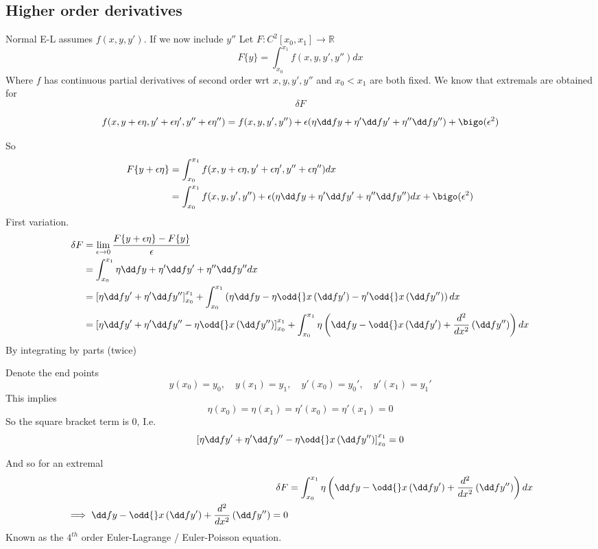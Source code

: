 \documentclass{E:/Documents/Latex/myassignment}
\begin{document}
\subsection{Higher order derivatives}
Normal E-L assumes $f(x,y,y')$. If we now include $y''$
Let $F : C^2[x_0,x_1] \to \mathbb{R}$
\[F\{y\} = \int_{x_0}^{x_1} f(x,y,y',y'')dx\]
Where $f$ has continuous partial derivatives of second order wrt $x,y,y',y''$ and $x_0<x_1$ are both fixed.
We know that extremals are obtained for
\[\delta F \]

\begin{align*}
	f(x,y+\epsilon \eta, y' + \epsilon \eta', y'' + \epsilon \eta '' ) &= f(x,y,y',y'') + \epsilon(\eta \dd fy + \eta' \dd f{y'} + \eta'' \dd f{y''}) + \bigo( \epsilon^2)\\
\end{align*}

So
\begin{align*}
	F\{y + \epsilon \eta\} &= \int_{x_0}^{x_1} f(x,y+\epsilon \eta, y' + \epsilon \eta', y'' + \epsilon \eta '' ) dx\\
	&=\int_{x_0}^{x_1}  f(x,y,y',y'') + \epsilon(\eta \dd fy + \eta' \dd f{y'} + \eta'' \dd f{y''})dx + \bigo( \epsilon^2)
\end{align*}
First variation.
\begin{align*}
	\delta F &= \lim_{\epsilon \to 0} \frac{F\{y + \epsilon \eta\} - F\{y\}}{\epsilon}\\
	&=\int_{x_0}^{x_1} \eta \dd fy + \eta ' \dd f{y'} + \eta '' \dd f{y''} dx\\
	&= \left[\eta \dd f{y'} + \eta' \dd f {y''}\right]_{x_0}^{x_1} + \int_{x_0}^{x_1} \left(\eta \dd fy - \eta \odd{}x \left(\dd f{y'}\right) - \eta' \odd{}x \left(\dd f{y''}\right)\right) dx\\
	&= \left[\eta \dd f{y'} + \eta' \dd f {y''} - \eta\odd{}x\left(\dd f{y''}\right)\right]_{x_0}^{x_1} + \int_{x_0}^{x_1} \eta\left(\dd fy - \odd{}x \left(\dd f{y'}\right) + \frac{d^2}{dx^2} \left(\dd f{y''}\right)\right) dx\\
\end{align*}
By integrating by parts (twice)

Denote the end points
\[y(x_0) = y_0, \quad y(x_1) = y_1, \quad y'(x_0) = y_0', \quad y'(x_1) = y_1'\]
This implies 
\[\eta(x_0) = \eta(x_1) = \eta'(x_0) = \eta'(x_1) = 0\]
So the square bracket term is $0$, I.e.
\[\left[\eta \dd f{y'} + \eta' \dd f {y''} - \eta\odd{}x\left(\dd f{y''}\right)\right]_{x_0}^{x_1}  = 0\]

And so for an extremal
\begin{align*}
	\delta F &= \int_{x_0}^{x_1} \eta\left(\dd fy - \odd{}x \left(\dd f{y'}\right) + \frac{d^2}{dx^2} \left(\dd f{y''}\right)\right) dx \\
	\implies \dd fy - \odd{}x \left(\dd f{y'}\right) + \frac{d^2}{dx^2} \left(\dd f{y''}\right) = 0
\end{align*}
Known as the $4^{th}$ order Euler-Lagrange / Euler-Poisson equation. 
\end{document}
